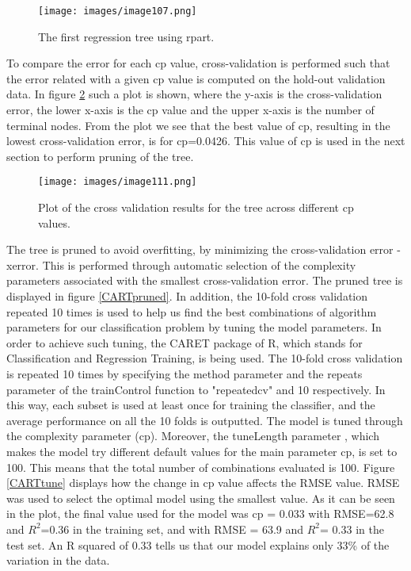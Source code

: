 \documentclass{usiinftr}
\begin{document}
\begin{figure}[h!] 
\centering
\texttt{[image: images/image107.png]}
\caption{The first regression tree using rpart.}
\label{CART1}
\end{figure}

To compare the error for each cp value, cross-validation is performed such that the error related with a given cp value is computed on the hold-out validation data. In figure \ref{CARTcv} such a plot is shown, where the y-axis is the cross-validation error, the lower x-axis is the cp value and the upper x-axis is the number of terminal nodes. From the plot we see that the best value of cp, resulting in the lowest cross-validation error, is for cp=0.0426. This value of cp is used in the next section to perform pruning of the tree. 

\begin{figure}[h!] 
\centering
\texttt{[image: images/image111.png]}
\caption{Plot of the cross validation results for the tree across different cp values.}
\label{CARTcv}
\end{figure}

The tree is pruned to avoid overfitting, by minimizing the cross-validation error - xerror. This is performed through automatic selection of the complexity parameters associated with the smallest cross-validation error. The pruned tree is displayed in figure \ref{CARTpruned}. In addition, the 10-fold cross validation repeated 10 times is used to help us find the best combinations of algorithm parameters for our classification problem by tuning the model parameters. In order to achieve such tuning, the CARET package of R, which stands for Classification and Regression Training, is being used. The 10-fold cross validation is repeated 10 times by specifying the method parameter and the repeats parameter of the trainControl function to "repeatedcv" and 10 respectively. In this way, each subset is used at least once for training the classifier, and the average performance on all the 10 folds is outputted. The model is tuned through the complexity parameter (cp). Moreover, the tuneLength parameter , which makes the model try different default values for the main parameter cp, is set to 100. This means that the total number of combinations evaluated is 100. Figure \ref{CARTtune} displays how the change in cp value affects the RMSE value. RMSE was used to select the optimal model using the smallest value. As it can be seen in the plot, the final value used for the model was cp = 0.033 with RMSE=62.8 and $R^2$=0.36 in the training set, and with RMSE = 63.9 and $R^2$= 0.33 in the test set. An R squared of 0.33 tells us that our model explains only 33\% of the variation in the data.
\end{document}
